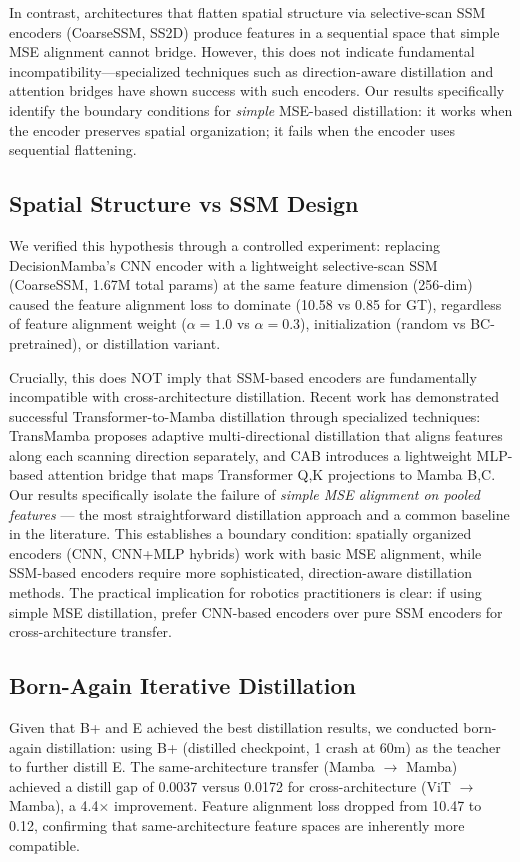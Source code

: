 \documentclass{article}
\begin{document}
In contrast, architectures that flatten spatial structure via selective-scan SSM encoders (CoarseSSM, SS2D) produce features in a sequential space that simple MSE alignment cannot bridge. However, this does not indicate fundamental incompatibility---specialized techniques such as direction-aware distillation \cite{transmamba2025} and attention bridges \cite{wang2025cab} have shown success with such encoders. Our results specifically identify the boundary conditions for \emph{simple} MSE-based distillation: it works when the encoder preserves spatial organization; it fails when the encoder uses sequential flattening.

\subsection{Spatial Structure vs SSM Design}
We verified this hypothesis through a controlled experiment: replacing DecisionMamba's CNN encoder with a lightweight selective-scan SSM (CoarseSSM, 1.67M total params) at the same feature dimension (256-dim) caused the feature alignment loss to dominate (10.58 vs 0.85 for GT), regardless of feature alignment weight ($\alpha=1.0$ vs $\alpha=0.3$), initialization (random vs BC-pretrained), or distillation variant.

Crucially, this does NOT imply that SSM-based encoders are fundamentally incompatible with cross-architecture distillation. Recent work has demonstrated successful Transformer-to-Mamba distillation through specialized techniques: TransMamba \cite{transmamba2025} proposes adaptive multi-directional distillation that aligns features along each scanning direction separately, and CAB \cite{wang2025cab} introduces a lightweight MLP-based attention bridge that maps Transformer Q,K projections to Mamba B,C. Our results specifically isolate the failure of \emph{simple MSE alignment on pooled features} — the most straightforward distillation approach and a common baseline in the literature. This establishes a boundary condition: spatially organized encoders (CNN, CNN+MLP hybrids) work with basic MSE alignment, while SSM-based encoders require more sophisticated, direction-aware distillation methods. The practical implication for robotics practitioners is clear: if using simple MSE distillation, prefer CNN-based encoders over pure SSM encoders for cross-architecture transfer.

\subsection{Born-Again Iterative Distillation}
Given that B+ and E achieved the best distillation results, we conducted born-again distillation: using B+ (distilled checkpoint, 1 crash at 60m) as the teacher to further distill E. The same-architecture transfer (Mamba $\rightarrow$ Mamba) achieved a distill gap of 0.0037 versus 0.0172 for cross-architecture (ViT $\rightarrow$ Mamba), a 4.4$\times$ improvement. Feature alignment loss dropped from 10.47 to 0.12, confirming that same-architecture feature spaces are inherently more compatible.
\end{document}
